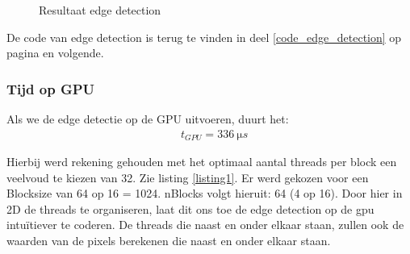 \documentclass[11pt,twoside,a4paper]{article}
\begin{document}
\begin{figure}[h!]
    \centering
    \hfill
    \caption{Resultaat edge detection}
    \label{fig:edge_dection}
\end{figure}



De code van edge detection is terug te vinden in deel \ref{code_edge_detection} op pagina \pageref{code_edge_detection} en volgende.


\subsubsection{Tijd op GPU}

Als we de edge detectie op de GPU uitvoeren, duurt het:
\begin{align*}
    &t_{GPU} = \SI{336}{\micro s}
\end{align*}

Hierbij werd rekening gehouden met het optimaal aantal threads per block een veelvoud te kiezen van 32. Zie listing \ref{listing1}. Er werd gekozen voor een Blocksize van 64 op 16 = 1024. nBlocks volgt hieruit: 64 (4 op 16). Door hier in 2D de threads te organiseren, laat dit ons toe de edge detection op de gpu intu\"itiever te coderen. De threads die naast en onder elkaar staan, zullen ook de waarden van de pixels berekenen die naast en onder elkaar staan.
\end{document}
